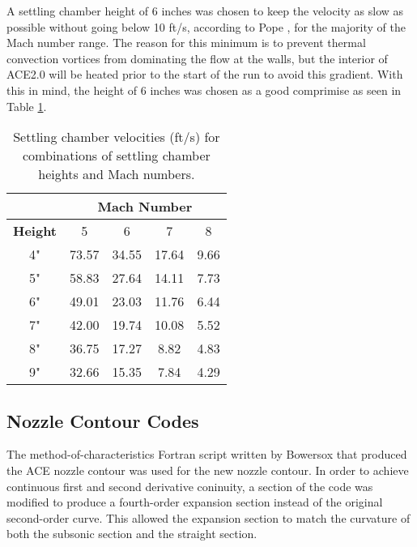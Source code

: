A settling chamber height of 6 inches was chosen to keep the velocity as slow as possible without going below 10 ft/s, according to Pope \cite{pope}, for the majority of the Mach number range. The reason for this minimum is to prevent thermal convection vortices from dominating the flow at the walls, but the interior of ACE2.0 will be heated prior to the start of the run to avoid this gradient. With this in mind, the height of 6 inches was chosen as a good comprimise as seen in Table \ref{tab:sc_vel}.

\begin{table}[ht]
    \centering
    \begin{tabular}{|c|c|c|c|c|}
        \cline{2-5}
        \multicolumn{1}{c}{} & \multicolumn{4}{|c|}{\textbf{Mach Number}} \\ \hline
        \textbf{Height} & 5 & 6 & 7 & 8 \\ \hline
        4" & 73.57 & 34.55 & 17.64 & 9.66 \\ \hline
        5" & 58.83 & 27.64 & 14.11 & 7.73 \\ \hline \hline
        6" & 49.01 & 23.03 & 11.76 & 6.44 \\ \hline \hline
        7" & 42.00 & 19.74 & 10.08 & 5.52 \\ \hline
        8" & 36.75 & 17.27 & 8.82 & 4.83 \\ \hline
        9" & 32.66 & 15.35 & 7.84 & 4.29 \\ \hline
    \end{tabular}
    \caption{Settling chamber velocities (ft/s) for combinations of settling chamber heights and Mach numbers.}
    \label{tab:sc_vel}
\end{table}
    
\subsection{Nozzle Contour Codes}

The method-of-characteristics Fortran script written by Bowersox that produced the ACE nozzle contour was used for the new nozzle contour. In order to achieve continuous first and second derivative coninuity, a section of the code was modified to produce a fourth-order expansion section instead of the original second-order curve. This allowed the expansion section to match the curvature of both the subsonic section and the straight section.

